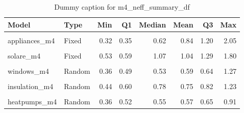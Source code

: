 \begin{table}
\centering
\caption{Dummy caption for m4_neff_summary_df}
\centering
\fontsize{10}{12}\selectfont
\begin{tabular}[t]{llrrrrrr}
\toprule
Model & Type & Min & Q1 & Median & Mean & Q3 & Max\\
\midrule
\cellcolor{gray!10}{windows\_m4} & \cellcolor{gray!10}{Fixed} & \cellcolor{gray!10}{0.34} & \cellcolor{gray!10}{0.37} & \cellcolor{gray!10}{0.76} & \cellcolor{gray!10}{0.87} & \cellcolor{gray!10}{1.23} & \cellcolor{gray!10}{1.95}\\
appliances\_m4 & Fixed & 0.32 & 0.35 & 0.62 & 0.84 & 1.20 & 2.05\\
\cellcolor{gray!10}{insulation\_m4} & \cellcolor{gray!10}{Fixed} & \cellcolor{gray!10}{0.43} & \cellcolor{gray!10}{0.46} & \cellcolor{gray!10}{0.90} & \cellcolor{gray!10}{1.09} & \cellcolor{gray!10}{1.59} & \cellcolor{gray!10}{2.30}\\
solare\_m4 & Fixed & 0.53 & 0.59 & 1.07 & 1.04 & 1.29 & 1.80\\
\cellcolor{gray!10}{heatpumps\_m4} & \cellcolor{gray!10}{Fixed} & \cellcolor{gray!10}{0.35} & \cellcolor{gray!10}{0.40} & \cellcolor{gray!10}{0.89} & \cellcolor{gray!10}{0.81} & \cellcolor{gray!10}{1.09} & \cellcolor{gray!10}{1.47}\\
windows\_m4 & Random & 0.36 & 0.49 & 0.53 & 0.59 & 0.64 & 1.27\\
\cellcolor{gray!10}{appliances\_m4} & \cellcolor{gray!10}{Random} & \cellcolor{gray!10}{0.35} & \cellcolor{gray!10}{0.53} & \cellcolor{gray!10}{0.60} & \cellcolor{gray!10}{0.64} & \cellcolor{gray!10}{0.75} & \cellcolor{gray!10}{1.22}\\
insulation\_m4 & Random & 0.44 & 0.60 & 0.78 & 0.75 & 0.82 & 1.23\\
\cellcolor{gray!10}{solare\_m4} & \cellcolor{gray!10}{Random} & \cellcolor{gray!10}{0.42} & \cellcolor{gray!10}{0.62} & \cellcolor{gray!10}{0.66} & \cellcolor{gray!10}{0.69} & \cellcolor{gray!10}{0.78} & \cellcolor{gray!10}{1.12}\\
heatpumps\_m4 & Random & 0.36 & 0.52 & 0.55 & 0.57 & 0.65 & 0.91\\
\bottomrule
\end{tabular}
\end{table}
